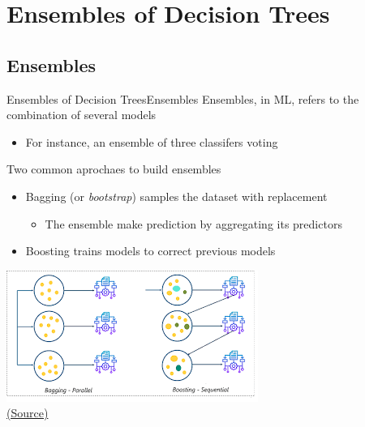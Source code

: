 \documentclass[10pt,compress]{beamer} %
\begin{document}
\section{Ensembles of Decision Trees}

\subsection{Ensembles}
\begin{frame}{Ensembles of Decision Trees}{Ensembles}
    \alert{Ensembles}, in ML, refers to the combination of several models
    \begin{itemize}
        \item For instance, an ensemble of three classifers voting
    \end{itemize}

    Two common aprochaes to build ensembles
    \begin{itemize}
        \item \alert{Bagging} (or \textit{bootstrap}) samples the dataset with replacement
            \begin{itemize}
                \item The ensemble make prediction by aggregating its predictors
            \end{itemize}
        \item \alert{Boosting} trains models to correct previous models
   \end{itemize}

    \centering \includegraphics[width=0.5\linewidth]{figs/baggingboosting.png}\\
    \centering\tiny{\href{https://medium.com/@maniyaswanth123/bagging-and-boosting-a0b39e312117}{(Source)}}
\end{frame}
\end{document}
